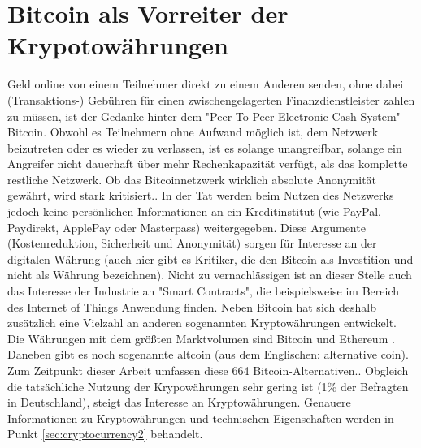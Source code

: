 \section{Bitcoin als Vorreiter der Krypotowährungen}\label{sec:cryptocurrency}
Geld online von einem Teilnehmer direkt zu einem Anderen senden, ohne dabei (Transaktions-) Gebühren für einen zwischengelagerten Finanzdienstleister zahlen zu müssen, ist der Gedanke hinter dem "Peer-To-Peer Electronic Cash System"\citep{nakamoto_bitcoin:_2008} Bitcoin. Obwohl es Teilnehmern ohne Aufwand möglich ist, dem Netzwerk beizutreten oder es wieder zu verlassen, ist es solange unangreifbar, solange ein Angreifer nicht dauerhaft über mehr Rechenkapazität verfügt, als das komplette restliche Netzwerk.\citep{nakamoto_bitcoin:_2008} Ob das Bitcoinnetzwerk wirklich absolute Anonymität gewährt, wird stark kritisiert.\citep{reid_analysis_2013,androulaki_evaluating_2013}. In der Tat werden beim Nutzen des Netzwerks jedoch keine persönlichen Informationen an ein Kreditinstitut (wie PayPal, Paydirekt, ApplePay oder Masterpass) weitergegeben. Diese Argumente (Kostenreduktion, Sicherheit und Anonymität) sorgen für Interesse an der digitalen Währung (auch hier gibt es Kritiker, die den Bitcoin als Investition und nicht als Währung bezeichnen)\citep{baur_bitcoin:_2015}. Nicht zu vernachlässigen ist an dieser Stelle auch das Interesse der Industrie an "Smart Contracts"\citep[S.~10]{dannen_introducing_2017}, die beispielsweise im Bereich des Internet of Things Anwendung finden.\citep{christidis_blockchains_2016}\newline
Neben Bitcoin hat sich deshalb zusätzlich eine Vielzahl an anderen sogenannten Kryptowährungen entwickelt. Die Währungen mit dem größten Marktvolumen sind  Bitcoin und Ethereum \citep{wood_ethereum:_2014}.\citep{brandt_infografik:_2017, coinmarketcap_ranking_2017} Daneben gibt es noch sogenannte \gls{altcoin} (aus dem Englischen: alternative coin\citep{prableen_bajpai_altcoin_2014}). Zum Zeitpunkt dieser Arbeit umfassen diese 664 Bitcoin-Alternativen.\citep{coindesk_anzahl_2017}. Obgleich die tatsächliche Nutzung der Krypowährungen sehr gering ist (1\% der Befragten in Deutschland\citep{tsys_kennen_2016}), steigt das Interesse an Kryptowährungen\citep{wikitrends_compare_2017,googletrends_googletrends_2017}.\newline
Genauere Informationen zu Kryptowährungen und technischen Eigenschaften werden in Punkt \ref{sec:cryptocurrency2} behandelt.


